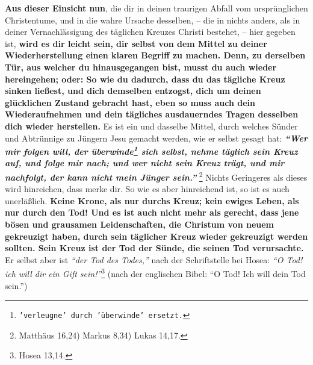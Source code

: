 \label{ref:02_10_abhilfe} \textbf{Aus dieser Einsicht nun}, die
dir in deinen traurigen Abfall vom ursprünglichen
Christentume, und in die wahre Ursache desselben, -- die in nichts anders, als
in deiner Vernachlässigung des täglichen Kreuzes Christi bestehet, -- hier
gegeben ist, \textbf{wird es dir leicht sein, dir selbst von dem Mittel zu
deiner
Wiederherstellung einen klaren Begriff zu machen. Denn, zu derselben Tür, aus
welcher du hinausgegangen bist, musst du auch wieder hereingehen; oder: So wie
du
dadurch, dass du das tägliche Kreuz sinken ließest, und dich demselben entzogst,
dich um deinen glücklichen Zustand gebracht hast, eben so muss auch dein
Wiederaufnehmen und dein tägliches ausdauerndes Tragen desselben dich wieder
herstellen.} Es ist ein und dasselbe Mittel, durch welches Sünder und Abtrünnige
zu Jüngern Jesu gemacht werden, wie er selbst gesagt hat:
\textbf{\textit{"`Wer mir
folgen will, der überwinde\footnote{\texttt{'verleugne' durch 'überwinde'
ersetzt.}}
sich selbst, nehme täglich sein Kreuz auf, und folge
mir nach; und wer nicht sein Kreuz trägt, und mir nachfolgt, der kann nicht mein
Jünger sein."'}}
\footnote{Matthäus 16,24) Markus 8,34) Lukas 14,17.}
 Nichts
Geringeres als dieses wird hinreichen, dass merke dir. So wie es aber
hinreichend
ist, so ist es auch unerläßlich. \textbf{Keine Krone, als nur durchs Kreuz;
kein ewiges Leben, als nur durch den Tod!
Und es ist auch nicht mehr als gerecht, dass jene
bösen und grausamen Leidenschaften, die Christum von neuem gekreuzigt haben,
durch sein täglicher Kreuz wieder gekreuzigt werden sollten. Sein Kreuz ist der
Tod der Sünde, die seinen Tod verursachte.} Er selbst aber ist
\textit{"`der Tod des Todes,"'} nach der Schriftstelle bei Hosea:
\textit{"`O Tod! ich will dir ein Gift sein!"'}\footnote{Hosea 13,14.}
 (nach der englischen Bibel: "`O Tod! Ich will
dein
Tod sein."')




